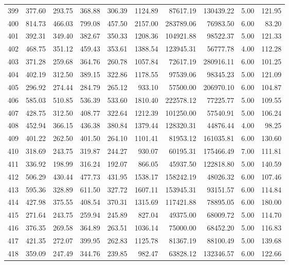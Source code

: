 \begin{tabular}{lrrrrrrrrr}
399 & 377.60 & 293.75 & 368.88 & 306.39 & 1124.89 & 87617.19 & 130439.22 & 5.00 & 121.95 \\
400 & 814.73 & 466.03 & 799.08 & 457.50 & 2157.00 & 283789.06 & 76983.50 & 6.00 & 83.20 \\
401 & 392.31 & 349.40 & 382.67 & 350.33 & 1208.36 & 104921.88 & 98522.37 & 5.00 & 121.33 \\
402 & 468.75 & 351.12 & 459.43 & 353.61 & 1388.54 & 123945.31 & 56777.78 & 4.00 & 112.28 \\
403 & 371.28 & 259.68 & 364.76 & 260.78 & 1057.84 & 72617.19 & 280916.11 & 6.00 & 101.25 \\
404 & 402.19 & 312.50 & 389.15 & 322.86 & 1178.55 & 97539.06 & 98345.23 & 5.00 & 121.09 \\
405 & 296.92 & 274.44 & 284.79 & 265.12 & 933.10 & 57500.00 & 206970.10 & 6.00 & 104.87 \\
406 & 585.03 & 510.85 & 536.39 & 533.60 & 1810.40 & 222578.12 & 77225.77 & 5.00 & 109.55 \\
407 & 428.75 & 312.50 & 408.77 & 322.64 & 1212.39 & 101250.00 & 57540.91 & 5.00 & 106.24 \\
408 & 452.94 & 366.15 & 436.38 & 380.84 & 1379.44 & 128320.31 & 44876.44 & 4.00 & 98.25 \\
409 & 401.22 & 262.50 & 401.50 & 264.10 & 1101.41 & 81953.12 & 161035.81 & 6.00 & 130.60 \\
410 & 318.69 & 243.75 & 319.87 & 244.27 & 930.07 & 60195.31 & 175466.49 & 7.00 & 111.81 \\
411 & 336.92 & 198.99 & 316.24 & 192.07 & 866.05 & 45937.50 & 122818.80 & 5.00 & 140.59 \\
412 & 506.29 & 430.44 & 477.73 & 431.95 & 1538.17 & 158242.19 & 48026.32 & 6.00 & 107.46 \\
413 & 595.36 & 328.89 & 611.50 & 327.72 & 1607.11 & 153945.31 & 93151.57 & 6.00 & 114.84 \\
414 & 427.98 & 375.55 & 408.54 & 370.31 & 1315.69 & 117421.88 & 78895.05 & 6.00 & 180.00 \\
415 & 271.64 & 243.75 & 259.94 & 245.89 & 827.04 & 49375.00 & 68009.72 & 5.00 & 114.70 \\
416 & 376.35 & 269.58 & 364.89 & 263.51 & 1036.14 & 75000.00 & 68452.20 & 5.00 & 116.83 \\
417 & 421.35 & 272.07 & 399.95 & 262.83 & 1125.78 & 81367.19 & 88100.49 & 5.00 & 139.68 \\
418 & 359.09 & 247.49 & 344.76 & 239.85 & 982.47 & 63828.12 & 132346.57 & 6.00 & 122.66 \\

\end{tabular}
